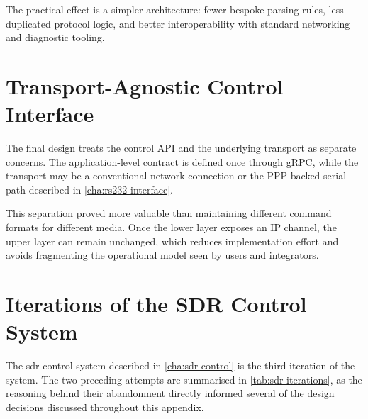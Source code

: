 The practical effect is a simpler architecture: fewer bespoke parsing rules,
less duplicated protocol logic, and better interoperability with standard
networking and diagnostic tooling.


\section{Transport-Agnostic Control Interface}
\label{sec:design-patterns:registry}
The final design treats the control API and the underlying transport as
separate concerns. The application-level contract is defined once through gRPC,
while the transport may be a conventional network connection or the
\gls{PPP}-backed serial path described in \autoref{cha:rs232-interface}.

This separation proved more valuable than maintaining different command formats
for different media. Once the lower layer exposes an IP channel, the upper
layer can remain unchanged, which reduces implementation effort and avoids
fragmenting the operational model seen by users and integrators.



\section{Iterations of the SDR Control System}
\label{sec:design-patterns:sdr-iterations}
 
The \gls{sdr-control-system} described in
\autoref{cha:sdr-control} is the third iteration of the system. The
two preceding attempts are summarised in
\autoref{tab:sdr-iterations}, as the reasoning behind their
abandonment directly informed several of the design decisions
discussed throughout this appendix.
 

